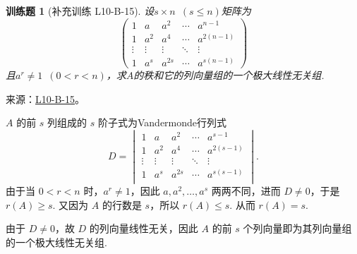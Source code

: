 \documentclass[12pt,fontset=fandol]{ctexart}
\newtheorem{exercise}{训练题}[section]
\begin{document}
\begin{exercise}[补充训练 L10-B-15]\label{prob:L10-B-15}
设$s \times n\enspace(s\leqslant n)$矩阵为
        \[\begin{pmatrix}
                1      & a      & a^2    & \cdots & a^{n-1}    \\
                1      & a^2    & a^4    & \cdots & a^{2(n-1)} \\
                \vdots & \vdots & \vdots & \ddots & \vdots     \\
                1      & a^s    & a^{2s} & \cdots & a^{s(n-1)}
            \end{pmatrix}\]
        且$a^r\neq 1\enspace(0<r<n)$，求$A$的秩和它的列向量组的一个极大线性无关组.
\end{exercise}
\noindent 来源：\href{https://github.com/yhwu-is/Linear-Algebra-Left-Undone/blob/new/%E8%AE%B2%E4%B9%89/%E4%B8%93%E9%A2%98/10%20%E8%A1%8C%E5%88%97%E5%BC%8F.tex}{L10-B-15}。
\begin{solve}
$A$ 的前 $s$ 列组成的 $s$ 阶子式为Vandermonde行列式
            \[D = \begin{vmatrix}
                    1      & a      & a^2    & \cdots & a^{s-1}    \\
                    1      & a^2    & a^4    & \cdots & a^{2(s-1)} \\
                    \vdots & \vdots & \vdots & \ddots & \vdots     \\
                    1      & a^s    & a^{2s} & \cdots & a^{s(s-1)} \\
                \end{vmatrix}.\]
            由于当 $0 < r < n$ 时，$a^r \neq 1$，因此 $a, a^2, \ldots, a^s$ 两两不同，进而 $D \neq 0$，于是 $r(A) \geqslant s$. 又因为 $A$ 的行数是 $s$，所以 $r(A) \leqslant s$. 从而 $r(A) = s$.

            由于 $D \neq 0$，故 $D$ 的列向量线性无关，因此 $A$ 的前 $s$ 个列向量即为其列向量组的一个极大线性无关组.
\end{solve}
\end{document}
